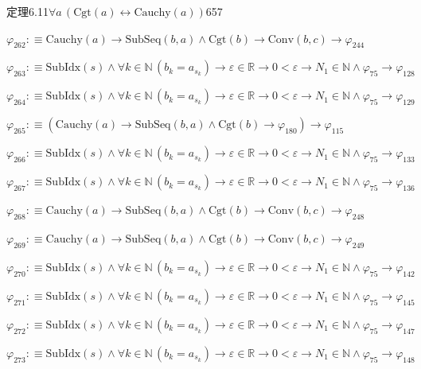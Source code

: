 \begin{fullproof}{定理6.11}{$\forall a\,(\mathrm{Cgt}(a) \leftrightarrow \mathrm{Cauchy}(a))$}{657}
\begin{abbrevlist}
\item $\varphi_{262} :\equiv \mathrm{Cauchy}(a) \to \mathrm{SubSeq}(b,a) \land \mathrm{Cgt}(b) \to \mathrm{Conv}(b,c) \to \varphi_{244}$
\item $\varphi_{263} :\equiv \mathrm{SubIdx}(s) \land \forall k \in \mathbb{N}\,(b_{k} = a_{s_{k}}) \to \varepsilon \in \mathbb{R} \to 0 < \varepsilon \to N_{1} \in \mathbb{N} \land \varphi_{75} \to \varphi_{128}$
\item $\varphi_{264} :\equiv \mathrm{SubIdx}(s) \land \forall k \in \mathbb{N}\,(b_{k} = a_{s_{k}}) \to \varepsilon \in \mathbb{R} \to 0 < \varepsilon \to N_{1} \in \mathbb{N} \land \varphi_{75} \to \varphi_{129}$
\item $\varphi_{265} :\equiv (\mathrm{Cauchy}(a) \to \mathrm{SubSeq}(b,a) \land \mathrm{Cgt}(b) \to \varphi_{180}) \to \varphi_{115}$
\item $\varphi_{266} :\equiv \mathrm{SubIdx}(s) \land \forall k \in \mathbb{N}\,(b_{k} = a_{s_{k}}) \to \varepsilon \in \mathbb{R} \to 0 < \varepsilon \to N_{1} \in \mathbb{N} \land \varphi_{75} \to \varphi_{133}$
\item $\varphi_{267} :\equiv \mathrm{SubIdx}(s) \land \forall k \in \mathbb{N}\,(b_{k} = a_{s_{k}}) \to \varepsilon \in \mathbb{R} \to 0 < \varepsilon \to N_{1} \in \mathbb{N} \land \varphi_{75} \to \varphi_{136}$
\item $\varphi_{268} :\equiv \mathrm{Cauchy}(a) \to \mathrm{SubSeq}(b,a) \land \mathrm{Cgt}(b) \to \mathrm{Conv}(b,c) \to \varphi_{248}$
\item $\varphi_{269} :\equiv \mathrm{Cauchy}(a) \to \mathrm{SubSeq}(b,a) \land \mathrm{Cgt}(b) \to \mathrm{Conv}(b,c) \to \varphi_{249}$
\item $\varphi_{270} :\equiv \mathrm{SubIdx}(s) \land \forall k \in \mathbb{N}\,(b_{k} = a_{s_{k}}) \to \varepsilon \in \mathbb{R} \to 0 < \varepsilon \to N_{1} \in \mathbb{N} \land \varphi_{75} \to \varphi_{142}$
\item $\varphi_{271} :\equiv \mathrm{SubIdx}(s) \land \forall k \in \mathbb{N}\,(b_{k} = a_{s_{k}}) \to \varepsilon \in \mathbb{R} \to 0 < \varepsilon \to N_{1} \in \mathbb{N} \land \varphi_{75} \to \varphi_{145}$
\item $\varphi_{272} :\equiv \mathrm{SubIdx}(s) \land \forall k \in \mathbb{N}\,(b_{k} = a_{s_{k}}) \to \varepsilon \in \mathbb{R} \to 0 < \varepsilon \to N_{1} \in \mathbb{N} \land \varphi_{75} \to \varphi_{147}$
\item $\varphi_{273} :\equiv \mathrm{SubIdx}(s) \land \forall k \in \mathbb{N}\,(b_{k} = a_{s_{k}}) \to \varepsilon \in \mathbb{R} \to 0 < \varepsilon \to N_{1} \in \mathbb{N} \land \varphi_{75} \to \varphi_{148}$

\end{abbrevlist}
\end{fullproof}

